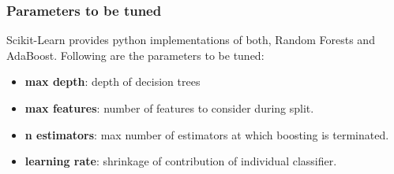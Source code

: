 \documentclass[12pt]{article}
\begin{document}
\subsubsection*{Parameters to be tuned}
Scikit-Learn provides python implementations of both, Random Forests and AdaBoost. Following are the parameters to be tuned:
\begin{itemize}
\item \textbf{max depth}: depth of decision trees
\item \textbf{max features}: number of features to consider during split.
\item \textbf{n estimators}:  max number of estimators at which boosting is terminated.
\item \textbf{learning rate}: shrinkage of contribution of individual classifier.
\end{itemize}
\end{document}
